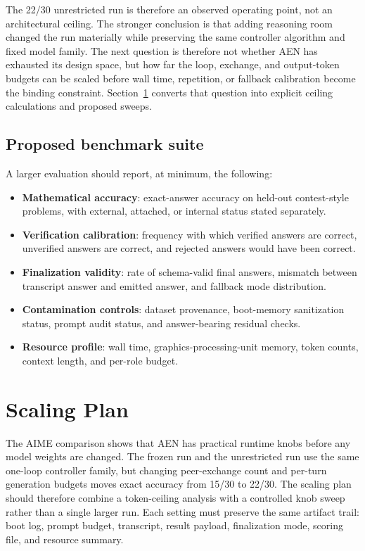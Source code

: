 \documentclass[11pt]{article}
\begin{document}
The 22/30 unrestricted run is therefore an observed operating point, not an architectural ceiling. The stronger conclusion is that adding reasoning room changed the run materially while preserving the same controller algorithm and fixed model family. The next question is therefore not whether AEN has exhausted its design space, but how far the loop, exchange, and output-token budgets can be scaled before wall time, repetition, or fallback calibration become the binding constraint. Section~\ref{sec:scaling-plan} converts that question into explicit ceiling calculations and proposed sweeps.

\subsection{Proposed benchmark suite}

A larger evaluation should report, at minimum, the following:

\begin{itemize}
  \item \textbf{Mathematical accuracy}: exact-answer accuracy on held-out contest-style problems, with external, attached, or internal status stated separately.
  \item \textbf{Verification calibration}: frequency with which verified answers are correct, unverified answers are correct, and rejected answers would have been correct.
  \item \textbf{Finalization validity}: rate of schema-valid final answers, mismatch between transcript answer and emitted answer, and fallback mode distribution.
  \item \textbf{Contamination controls}: dataset provenance, boot-memory sanitization status, prompt audit status, and answer-bearing residual checks.
  \item \textbf{Resource profile}: wall time, graphics-processing-unit memory, token counts, context length, and per-role budget.
\end{itemize}

\section{Scaling Plan}
\label{sec:scaling-plan}

The AIME comparison shows that AEN has practical runtime knobs before any model weights are changed. The frozen run and the unrestricted run use the same one-loop controller family, but changing peer-exchange count and per-turn generation budgets moves exact accuracy from 15/30 to 22/30. The scaling plan should therefore combine a token-ceiling analysis with a controlled knob sweep rather than a single larger run. Each setting must preserve the same artifact trail: boot log, prompt budget, transcript, result payload, finalization mode, scoring file, and resource summary.
\end{document}
